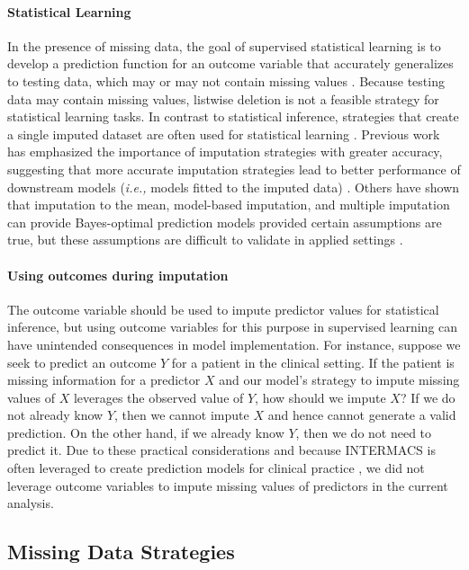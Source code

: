 \documentclass{article}
\begin{document}
\paragraph{Statistical Learning}

In the presence of missing data, the goal of supervised statistical
learning is to develop a prediction function for an outcome variable
that accurately generalizes to testing data, which may or may not
contain missing values \cite{hastie2009elements}. Because testing data
may contain missing values, listwise deletion is not a feasible strategy
for statistical learning tasks. In contrast to statistical inference,
strategies that create a single imputed dataset are often used for
statistical learning \cite{kuhn2019feature}. Previous work has
emphasized the importance of imputation strategies with greater
accuracy, suggesting that more accurate imputation strategies lead to
better performance of downstream models (\textit{i.e., } models fitted
to the imputed data) \cite{jerez2010missing}. Others have shown that
imputation to the mean, model-based imputation, and multiple imputation
can provide Bayes-optimal prediction models provided certain assumptions
are true, but these assumptions are difficult to validate in applied
settings \cite{josse2019consistency}.

\paragraph{Using outcomes during imputation}

The outcome variable should be used to impute predictor values for
statistical inference, but using outcome variables for this purpose in
supervised learning can have unintended consequences in model
implementation. For instance, suppose we seek to predict an outcome
\(Y\) for a patient in the clinical setting. If the patient is missing
information for a predictor \(X\) and our model's strategy to impute
missing values of \(X\) leverages the observed value of \(Y\), how
should we impute \(X\)? If we do not already know \(Y\), then we cannot
impute \(X\) and hence cannot generate a valid prediction. On the other
hand, if we already know \(Y\), then we do not need to predict it. Due
to these practical considerations and because INTERMACS is often
leveraged to create prediction models for clinical practice
\cite{thomas2014pre}, we did not leverage outcome variables to impute
missing values of predictors in the current analysis.

\hypertarget{missing-data-strategies}{%
\subsection{Missing Data Strategies}\label{missing-data-strategies}}
\end{document}
